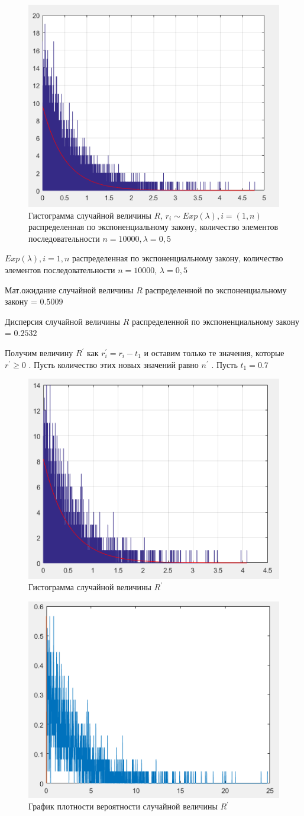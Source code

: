 \begin{figure}[h]
	\centering\includegraphics[width=0.4\linewidth]{img/kich_bur/image1.png}
	\caption{Гистограмма случайной величины $ R $, $r_i \sim Exp(\lambda),i=(1,n) $ распределенная по экспоненциальному закону, количество элементов последовательности $ n=10000, \lambda=0,5 $}
	\label{fig:img1}
\end{figure}

$Exp(\lambda),i=1,n$
распределенная по экспоненциальному закону, количество элементов последовательности
$n=10000$, $\lambda=0,5$ 


Мат.ожидание случайной величины $ R $ распределенной по экспоненциальному
закону = $ 0.5009  $

Дисперсия случайной величины $ R $ распределенной по экспоненциальному
закону = $ 0.2532 $ 

Получим величину $R^{'}$ как $r_{i}^{'}=r_{i}-t_{1}$ и оставим
только те значения, которые $r^{'}\geq0$ . Пусть количество этих
новых значений равно $n^{'}$ . Пусть $t_{1}=0.7$

\begin{figure}[h]
	\centering
	\includegraphics[width=0.4\linewidth]{img/kich_bur/image2.png}
	\caption{Гистограмма случайной величины $ R^{'} $}
	\label{fig:img2}
\end{figure}

\begin{figure}[h]
	\centering
	\includegraphics[width=0.4\linewidth]{img/kich_bur/image3.png}
	\caption{График плотности вероятности случайной величины $ R^{'} $}
	\label{fig:img3}
\end{figure}


